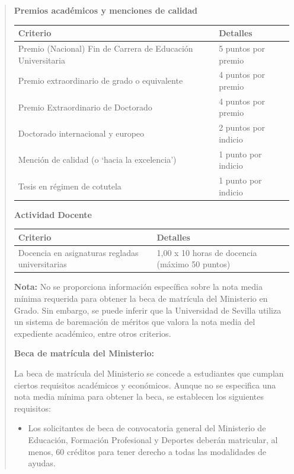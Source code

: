 \documentclass[12pt,a4paper,oneside]{report}
\begin{document}
\begin{itemize}
\begin{itemize}
\begin{quote}
\noindent\textbf{Premios académicos y menciones de calidad}\\


\begin{tabular}{p{3.5cm} p{8cm}}
\toprule
\textbf{Criterio} & \textbf{Detalles} \\
\midrule
Premio (Nacional) Fin de Carrera de Educación Universitaria & 5 puntos por premio \\
Premio extraordinario de grado o equivalente & 4 puntos por premio \\
Premio Extraordinario de Doctorado & 4 puntos por premio \\
Doctorado internacional y europeo & 2 puntos por indicio \\
Mención de calidad (o `hacia la excelencia') & 1 punto por indicio \\
Tesis en régimen de cotutela & 1 punto por indicio \\
\bottomrule
\end{tabular}



\noindent\textbf{Actividad Docente}\\


\begin{tabular}{p{3.5cm} p{8cm}}
\toprule
\textbf{Criterio} & \textbf{Detalles} \\
\midrule
Docencia en asignaturas regladas universitarias & 1,00 x 10 horas de docencia (máximo 50 puntos) \\
\bottomrule
\end{tabular}


\textbf{Nota:} No se proporciona información específica sobre la nota media mínima requerida para obtener la beca de matrícula del Ministerio en Grado. Sin embargo, se puede inferir que la Universidad de Sevilla utiliza un sistema de baremación de méritos que valora la nota media del expediente académico, entre otros criterios.

\textbf{Beca de matrícula del Ministerio:}

La beca de matrícula del Ministerio se concede a estudiantes que cumplan ciertos requisitos académicos y económicos. Aunque no se especifica una nota media mínima para obtener la beca, se establecen los siguientes requisitos:

\begin{itemize}
  \item Los solicitantes de beca de convocatoria general del Ministerio de Educación, Formación Profesional y Deportes deberán matricular, al menos, 60 créditos para tener derecho a todas las modalidades de ayudas.
\end{itemize}


\end{quote}
\end{itemize}
\end{itemize}
\end{document}
